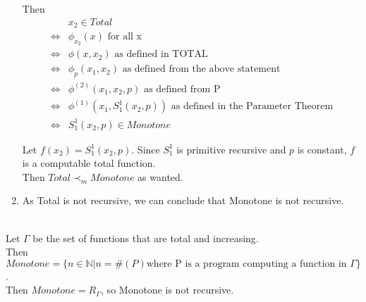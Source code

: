 \documentclass{assignment}
\begin{document}
\begin{problemlist}
\begin{answer}
\begin{enumerate}
      Then
      \begin{align*}
        &x_{2} \in Total\\
        \Longleftrightarrow& \phi_{x_{2}}(x) \text{ for all x}\\
        \Longleftrightarrow& \phi(x,x_{2}) \text{ as defined in TOTAL}\\
        \Longleftrightarrow& \phi_{p}(x_{1},x_{2}) \text{ as defined from the above statement}\\
        \Longleftrightarrow& \phi^{(2)}(x_{1},x_{2}, p) \text{ as defined from P}\\
        \Longleftrightarrow& \phi^{(1)}(x_{1}, S_{1}^{1}(x_{2},p)) \text{ as defined in the Parameter Theorem}\\
        \Longleftrightarrow& S_{1}^{1}(x_{2},p) \in Monotone
      \end{align*}
      
      Let $f(x_2)=S_1^1(x_2,p)$. Since $S_1^1$ is primitive recursive and $p$ is constant, $f$ is a computable total function.\\
      Then $Total\prec_m Monotone$ as wanted.
    \item
      As Total is not recursive, we can conclude that Monotone is not recursive.
    \end{enumerate}
  \end{answer}
  
  \pbitem
  \begin{problem}
  \end{problem}
  \begin{answer}
    \\
    Let $\Gamma$ be the set of functions that are total and increasing.\\
    Then $Monotone=\{n\in \mathbb{N} | n=\#(P) \text{where P is a program computing a function in }\Gamma\}$.\\
    Then $Monotone=R_{\Gamma}$, so Monotone is not recursive.\\
  \end{answer}

\end{problemlist}
\end{document}
